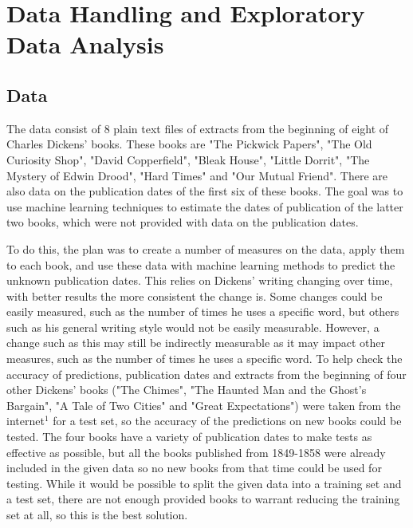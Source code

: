 \documentclass[11pt,a4paper,reqno]{amsart}
\begin{document}
\section{Data Handling and Exploratory Data Analysis}
\subsection{Data}

The data consist of 8 plain text files of extracts from the beginning of eight of Charles Dickens' books. These books are "The Pickwick Papers", "The Old Curiosity Shop", "David Copperfield", "Bleak House", "Little Dorrit", "The Mystery of Edwin Drood", "Hard Times" and "Our Mutual Friend".  There are also data on the publication dates of the first six of these books. The goal was to use machine learning techniques to estimate the dates of publication of the latter two books, which were not provided with data on the publication dates. 

To do this, the plan was to create a number of measures on the data, apply them to each book, and use these data with machine learning methods to predict the unknown publication dates. This relies on Dickens' writing changing over time, with better results the more consistent the change is. Some changes could be easily measured, such as the number of times he uses a specific word, but others such as his general writing style would not be easily measurable. However, a change such as this may still be indirectly measurable as it may impact other measures, such as the number of times he uses a specific word. To help check the accuracy of predictions, publication dates and extracts from the beginning of four other Dickens' books ("The Chimes", "The Haunted Man and the Ghost's Bargain", "A Tale of Two Cities" and "Great Expectations") were taken from the internet$^1$ for a test set, so the accuracy of the predictions on new books could be tested. The four books have a variety of publication dates to make tests as effective as possible, but all the books published from 1849-1858 were already included in the given data so no new books from that time could be used for testing. While it would be possible to split the given data into a training set and a test set, there are not enough provided books to warrant reducing the training set at all, so this is the best solution.
\end{document}
